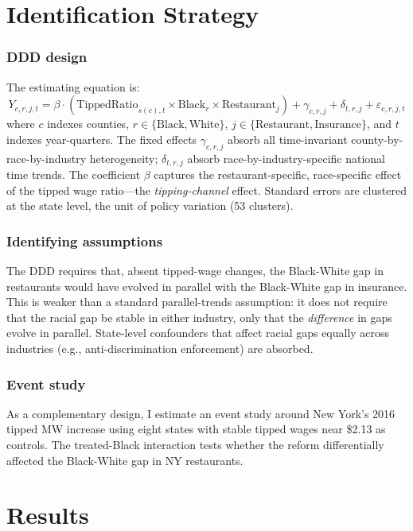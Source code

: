 \documentclass[12pt]{article}
\begin{document}
\section{Identification Strategy}

\subsubsection*{DDD design} The estimating equation is:
\begin{equation}
Y_{c,r,j,t} = \beta \cdot (\text{TippedRatio}_{s(c),t} \times \text{Black}_{r} \times \text{Restaurant}_{j}) + \gamma_{c,r,j} + \delta_{t,r,j} + \varepsilon_{c,r,j,t}
\label{eq:ddd}
\end{equation}
where $c$ indexes counties, $r \in \{\text{Black}, \text{White}\}$, $j \in \{\text{Restaurant}, \text{Insurance}\}$, and $t$ indexes year-quarters. The fixed effects $\gamma_{c,r,j}$ absorb all time-invariant county-by-race-by-industry heterogeneity; $\delta_{t,r,j}$ absorb race-by-industry-specific national time trends. The coefficient $\beta$ captures the restaurant-specific, race-specific effect of the tipped wage ratio---the \textit{tipping-channel} effect. Standard errors are clustered at the state level, the unit of policy variation (53 clusters).

\subsubsection*{Identifying assumptions} The DDD requires that, absent tipped-wage changes, the Black-White gap in restaurants would have evolved in parallel with the Black-White gap in insurance. This is weaker than a standard parallel-trends assumption: it does not require that the racial gap be stable in either industry, only that the \textit{difference} in gaps evolve in parallel. State-level confounders that affect racial gaps equally across industries (e.g., anti-discrimination enforcement) are absorbed.

\subsubsection*{Event study} As a complementary design, I estimate an event study around New York's 2016 tipped MW increase using eight states with stable tipped wages near \$2.13 as controls. The treated-Black interaction tests whether the reform differentially affected the Black-White gap in NY restaurants.

\section{Results}
\end{document}
